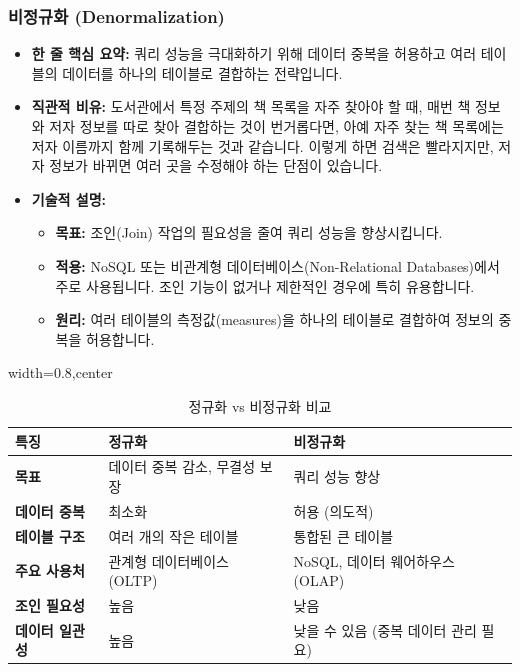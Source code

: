 \documentclass[11pt,a4paper]{article}
\theoremstyle{definition}
\begin{document}
\subsubsection{비정규화 (Denormalization)}
\begin{itemize}
    \item \textbf{한 줄 핵심 요약:} 쿼리 성능을 극대화하기 위해 데이터 중복을 허용하고 여러 테이블의 데이터를 하나의 테이블로 결합하는 전략입니다.
    \item \textbf{직관적 비유:} 도서관에서 특정 주제의 책 목록을 자주 찾아야 할 때, 매번 책 정보와 저자 정보를 따로 찾아 결합하는 것이 번거롭다면, 아예 자주 찾는 책 목록에는 저자 이름까지 함께 기록해두는 것과 같습니다. 이렇게 하면 검색은 빨라지지만, 저자 정보가 바뀌면 여러 곳을 수정해야 하는 단점이 있습니다.
    \item \textbf{기술적 설명:}
    \begin{itemize}
        \item \textbf{목표:} 조인(Join) 작업의 필요성을 줄여 쿼리 성능을 향상시킵니다.
        \item \textbf{적용:} NoSQL 또는 비관계형 데이터베이스(Non-Relational Databases)에서 주로 사용됩니다. 조인 기능이 없거나 제한적인 경우에 특히 유용합니다.
        \item \textbf{원리:} 여러 테이블의 측정값(measures)을 하나의 테이블로 결합하여 정보의 중복을 허용합니다.
    \end{itemize}
\end{itemize}

\begin{table}[htbp]
\centering
\caption{정규화 vs 비정규화 비교}
\label{tab:normalization_vs_denormalization}
\begin{adjustbox}{width=0.8\textwidth,center}
\begin{tabular}{lll}
\toprule
\textbf{특징} & \textbf{정규화} & \textbf{비정규화} \\
\midrule
\textbf{목표} & 데이터 중복 감소, 무결성 보장 & 쿼리 성능 향상 \\
\textbf{데이터 중복} & 최소화 & 허용 (의도적) \\
\textbf{테이블 구조} & 여러 개의 작은 테이블 & 통합된 큰 테이블 \\
\textbf{주요 사용처} & 관계형 데이터베이스 (OLTP) & NoSQL, 데이터 웨어하우스 (OLAP) \\
\textbf{조인 필요성} & 높음 & 낮음 \\
\textbf{데이터 일관성} & 높음 & 낮을 수 있음 (중복 데이터 관리 필요) \\
\bottomrule
\end{tabular}
\end{adjustbox}
\end{table}
\end{document}
